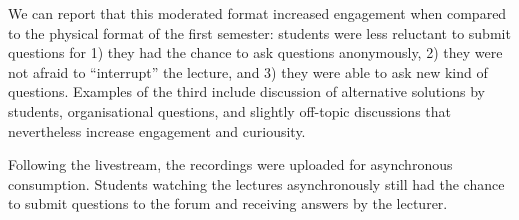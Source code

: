 We can report that this moderated format increased engagement when compared to the physical format of the first semester:
students were less reluctant to submit questions for
1) they had the chance to ask questions anonymously,
2) they were not afraid to ``interrupt'' the lecture, and
3) they were able to ask new kind of questions.
Examples of the third include discussion of alternative solutions by students,
organisational questions,
and slightly off-topic discussions that nevertheless increase engagement and curiousity.

Following the livestream,
the recordings were uploaded for asynchronous consumption.
Students watching the lectures asynchronously still had the chance to submit questions to the forum and receiving answers by the lecturer.

